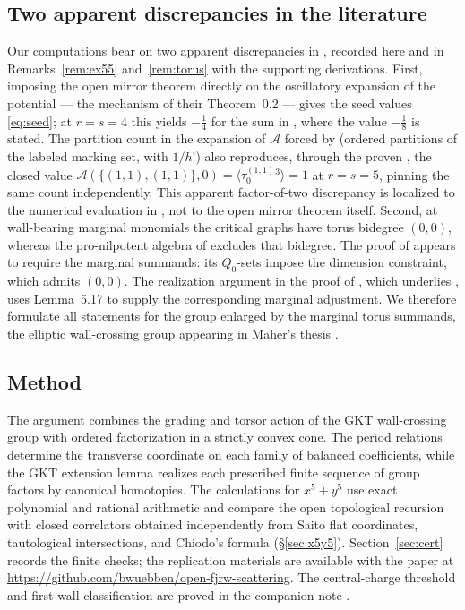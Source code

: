 \documentclass[11pt]{amsart}
\theoremstyle{definition}
\theoremstyle{remark}
\newcommand{\Ascr}{\mathcal{A}}
\begin{document}
\subsection{Two apparent discrepancies in the literature}
Our computations bear on two apparent discrepancies in \cite{GKT,GKTsurvey}, recorded here and in
Remarks~\ref{rem:ex55} and~\ref{rem:torus} with the supporting derivations.
First, imposing the open mirror theorem \cite[Thm.~0.3]{GKT} directly on the
oscillatory expansion of the potential --- the mechanism of their Theorem~0.2 ---
gives the seed values \eqref{eq:seed}; at $r=s=4$ this yields $-\tfrac14$ for the
sum in \cite[Ex.~5.5]{GKTsurvey}, where the value $-\tfrac18$ is stated. The
partition count in the expansion of $\Ascr$ forced by
\cite[Notation~3.42 and Thm.~5.1]{GKT} (ordered partitions of the labeled
marking set, with $1/h!$) also reproduces, through the
proven \cite[Thm.~5.4]{GKT}, the closed value
$\Ascr(\{(1,1),(1,1)\},0)=\langle\tau_{0}^{(1,1)}{}^{3}\rangle=1$ at $r=s=5$,
pinning the same count independently. This apparent factor-of-two discrepancy is
localized to the numerical evaluation in \cite[Ex.~5.5]{GKTsurvey}, not to the
open mirror theorem itself. Second, at wall-bearing marginal monomials the
critical graphs have torus bidegree $(0,0)$, whereas the pro-nilpotent algebra of
\cite[Def.~4.23]{GKT} excludes that bidegree. The proof of
\cite[Thm.~5.9]{GKT} appears to require the marginal summands: its
$Q_{0}$-sets impose the dimension constraint, which admits $(0,0)$. The
realization argument in the proof of \cite[Thm.~5.13]{GKT}, which underlies
\cite[Cor.~5.14]{GKT}, uses Lemma~5.17 to supply the corresponding marginal
adjustment. We therefore formulate
all statements for the group enlarged by the marginal torus summands, the
elliptic wall-crossing group appearing in Maher's thesis \cite[\S5.2.2]{Maher}.

\subsection{Method}
The argument combines the grading and torsor action of the GKT wall-crossing
group with ordered factorization in a strictly convex cone.  The period
relations determine the transverse coordinate on each family of balanced
coefficients, while the GKT extension lemma realizes each prescribed finite
sequence of group factors by canonical homotopies.  The calculations for
$x^5+y^5$ use exact polynomial and rational arithmetic and compare the open
topological recursion with closed correlators obtained independently from
Saito flat coordinates, tautological intersections, and Chiodo's formula
(\S\ref{sec:x5y5}).  Section~\ref{sec:cert} records the finite checks; the
replication materials are available with the paper at
\url{https://github.com/bwuebben/open-fjrw-scattering}.  The central-charge
threshold and first-wall classification are proved in the companion note
\cite{note}.
\end{document}
